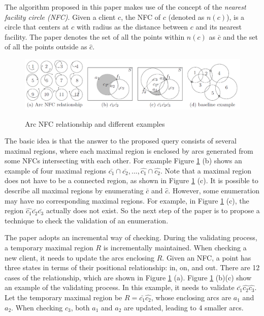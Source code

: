 \documentclass[paper=a4, fontsize=18pt]{article} %
\numberwithin{equation}{section} %
\numberwithin{figure}{section} %
\numberwithin{table}{section} %
\begin{document}
The algorithm proposed in this paper makes use of the concept of the \emph{nearest facility circle (NFC)}. Given a client $c$, the NFC of $c$ (denoted as $n(c)$), is a circle that centers at $c$ with radius as the distance between $c$ and its nearest facility. The paper denotes the set of all the points within $n(c)$ as $\bar{c}$ and the set of all the points outside as $\hat{c}$.

\begin{figure}[h]
  \centering
  \includegraphics[width=\linewidth]{9_12_CIKM2.png}\\
  \caption{Arc NFC relationship and different examples}\label{fig:CIKM2}
\end{figure}

The basic idea is that the answer to the proposed query consists of several maximal regions, where each maximal region is enclosed by arcs generated from some NFCs intersecting with each other. For example Figure \ref{fig:CIKM2} (b) shows an example of four maximal regions $\bar{c_1} \cap \bar{c_2}, ..., \hat{c_1} \cap \hat{c_2}$. Note that a maximal region does not have to be a connected region, as shown in Figure \ref{fig:CIKM2} (c). It is possible to describe all maximal regions by enumerating $\bar{c}$ and $\hat{c}$. However, some enumeration may have no corresponding maximal regions. For example, in Figure \ref{fig:CIKM2} (c), the region $\hat{c_1}\bar{c_2}\bar{c_3}$ actually does not exist. So the next step of the paper is to propose a technique to check the validation of an enumeration.

The paper adopts an incremental way of checking. During the validating process, a temporary maximal region $R$ is incrementally maintained. When checking a new client, it needs to update the arcs enclosing $R$. Given an NFC, a point has three states in terms of their positional relationship: in, on, and out. There are 12 cases of the relationship, which are shown in Figure \ref{fig:CIKM2} (a). Figure \ref{fig:CIKM2} (b)(c) show an example of the validating process. In this example, it needs to validate $\bar{c_1}\hat{c_2}\hat{c_3}$. Let the temporary maximal region be $R=\bar{c_1}\hat{c_2}$, whose enclosing arcs are $a_1$ and $a_2$. When checking $c_3$, both $a_1$ and $a_2$ are updated, leading to 4 smaller arcs.
\end{document}
